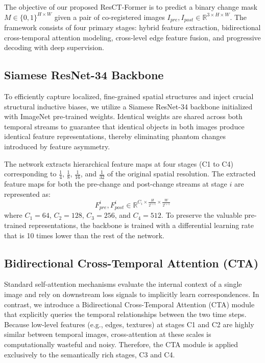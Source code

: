 \documentclass[conference]{IEEEtran}
\begin{document}
The objective of our proposed ResCT-Former is to predict a binary change mask $M \in \{0,1\}^{H \times W}$ given a pair of co-registered images $I_{pre}, I_{post} \in \mathbb{R}^{3 \times H \times W}$. The framework consists of four primary stages: hybrid feature extraction, bidirectional cross-temporal attention modeling, cross-level edge feature fusion, and progressive decoding with deep supervision.

\subsection{Siamese ResNet-34 Backbone}

To efficiently capture localized, fine-grained spatial structures and inject crucial structural inductive biases, we utilize a Siamese ResNet-34 backbone initialized with ImageNet pre-trained weights. Identical weights are shared across both temporal streams to guarantee that identical objects in both images produce identical feature representations, thereby eliminating phantom changes introduced by feature asymmetry. 

The network extracts hierarchical feature maps at four stages (C1 to C4) corresponding to $\frac{1}{4}$, $\frac{1}{8}$, $\frac{1}{16}$, and $\frac{1}{32}$ of the original spatial resolution. The extracted feature maps for both the pre-change and post-change streams at stage $i$ are represented as:
\begin{equation}
F_{pre}^{i}, F_{post}^{i} \in \mathbb{R}^{C_i \times \frac{H}{2^{i+1}} \times \frac{W}{2^{i+1}}}
\end{equation}
where $C_1=64$, $C_2=128$, $C_3=256$, and $C_4=512$. To preserve the valuable pre-trained representations, the backbone is trained with a differential learning rate that is 10 times lower than the rest of the network.

\subsection{Bidirectional Cross-Temporal Attention (CTA)}

Standard self-attention mechanisms evaluate the internal context of a single image and rely on downstream loss signals to implicitly learn correspondences. In contrast, we introduce a Bidirectional Cross-Temporal Attention (CTA) module that explicitly queries the temporal relationships between the two time steps. Because low-level features (e.g., edges, textures) at stages C1 and C2 are highly similar between temporal images, cross-attention at these scales is computationally wasteful and noisy. Therefore, the CTA module is applied exclusively to the semantically rich stages, C3 and C4.
\end{document}
